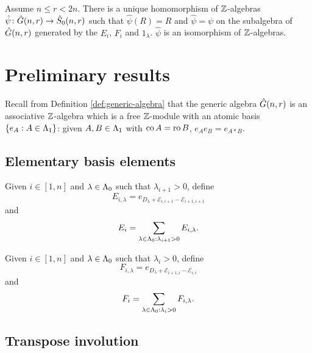 \documentclass[a4paper, 11pt]{report}
\begin{document}
\begin{theorem}
Assume $n\le r< 2n$. There is a unique homomorphism of $\mathbb{Z}$-algebras $\hat{\psi}\colon\hat{G}(n,r)\to\hat{S}_0(n,r)$ such that $\hat{\psi}(R)=R$ and $\hat{\psi}=\psi$ on the subalgebra of $\hat{G}(n,r)$ generated by the $E_i$, $F_i$ and $1_\lambda$. $\hat{\psi}$ is an isomorphism of $\mathbb{Z}$-algebras.
\end{theorem}

\section{Preliminary results}

Recall from Definition \ref{def:generic-algebra} that the generic algebra $\hat{G}(n,r)$ is an associative $\mathbb{Z}$-algebra which is a free $\mathbb{Z}$-module with an atomic basis $\{e_A:A\in{\Lambda_1}\}$: given $A,B\in{\Lambda_1}$ with $\operatorname{co}{A}=\operatorname{ro}{B}$, $e_Ae_B = e_{A\ast B}$.

\subsection{Elementary basis elements}

Given $i\in[1,n]$ and $\lambda\in{\Lambda_0}$ such that $\lambda_{i+1}>0$, define
\begin{equation*}
E_{i,\lambda} = e_{D_\lambda + \mathcal{E}_{i,i+1} - \mathcal{E}_{i+1,i+1}}
\end{equation*}
and
\begin{equation*}
E_i = \sum_{\lambda\in{\Lambda_0}:\lambda_{i+1}>0} E_{i,\lambda}.
\end{equation*}

Given $i\in[1,n]$ and $\lambda\in{\Lambda_0}$ such that $\lambda_i>0$, define
\begin{equation*}
F_{i,\lambda} = e_{D_\lambda + \mathcal{E}_{i+1,i} - \mathcal{E}_{i,i}}
\end{equation*}
and
\begin{equation*}
F_i = \sum_{\lambda\in{\Lambda_0}:\lambda_i>0} F_{i,\lambda}.
\end{equation*}

\subsection{Transpose involution}
\end{document}
